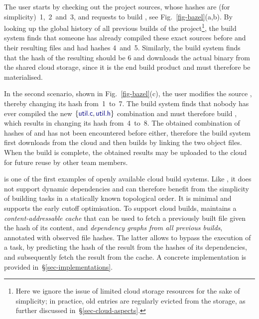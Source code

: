 The user starts by checking out the project sources, whose hashes are (for
simplicity)~1,~2~and~3, and requests to build , see
Fig.~\ref{fig-bazel}(a,b). By looking up the global history of all previous
builds of the project\footnote{Here we ignore the issue of limited cloud storage
resources for the sake of simplicity; in practice, old entries are regularly
evicted from the storage, as further discussed in~\S\ref{sec-cloud-aspects}.},
the build system finds that someone has already compiled these exact sources
before and their resulting files  and  had hashes 4~and~5.
Similarly, the build system finds that the hash of the resulting 
should be 6 and downloads the actual binary from the shared cloud storage, since
it is the end build product and must therefore be materialised.

In the second scenario, shown in Fig.~\ref{fig-bazel}(c), the user modifies the
source , thereby changing its hash from~1~to~7. The build system
finds that nobody has ever compiled the new $\{\cmd{util.c}, \cmd{util.h}\}$
combination and must therefore build , which results in changing its
hash from~4~to~8. The obtained combination of hashes of  and
 has not been encountered before either, therefore the build system
first downloads  from the cloud and then builds  by
linking the two object files. When the build is complete, the obtained results
may be uploaded to the cloud for future reuse by other team members.

\Bazel is one of the first examples of openly available cloud build systems.
Like \Make, it does not support dynamic dependencies and can therefore benefit
from the simplicity of building tasks in a statically known topological order.
It is minimal and supports the early cutoff optimisation. To support cloud
builds, \Bazel maintains a \emph{content-addressable cache} that can be used to
fetch a previously built file given the hash of its content, and
\emph{dependency graphs from all previous builds}, annotated with observed file
hashes. The latter allows to bypass the execution of a task, by predicting the
hash of the result from the hashes of its dependencies, and subsequently
fetch the result from the cache. A concrete implementation is provided
in~\S\ref{sec-implementations}.

